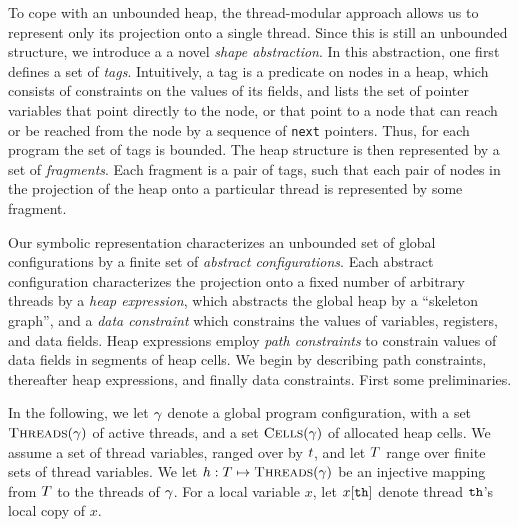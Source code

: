 To cope with an unbounded heap, the thread-modular approach allows us to
represent only its projection onto a single thread.
Since this is still an unbounded structure, we introduce a 
a novel {\em shape abstraction}. In this abstraction, one first defines a
set of {\em tags}. Intuitively, a tag is a predicate on nodes in a heap,
which consists of constraints on the values of its fields, and lists
the set of pointer variables that point directly to the node, or that point
to a node that can reach or be reached from the node by a sequence of
{\tt next} pointers. Thus, for each program the set of tags is bounded.
The heap structure is then represented by a set of {\em fragments}. Each
fragment is a pair of tags, such that each pair of nodes in the
projection of the heap onto a particular thread is represented by some
fragment.


Our symbolic representation characterizes an unbounded set of
global configurations by a finite set of {\em abstract configurations}. Each
abstract configuration characterizes the projection onto a fixed number of
arbitrary threads by a {\em heap expression}, which 
abstracts  the global heap by a ``skeleton graph'', and a {\em data constraint}
which constrains the values of variables, registers, and data fields.
Heap expressions employ {\em path constraints}
to constrain values of data fields in
segments of heap cells.
We begin by describing path constraints, thereafter heap expressions, and
finally data constraints. First some preliminaries.

In the following, we let $\gamma$ denote a global program configuration,
with a set $\mbox{\sc Threads}(\gamma)$ of active threads, and a set
$\mbox{\sc Cells}(\gamma)$ of allocated heap cells.
We assume a set of thread variables, ranged over by $t$, and
let $T$ range over finite sets of thread variables.
We let $h:T \mapsto \mbox{\sc Threads}(\gamma)$ be an injective mapping
from $T$ to the threads of $\gamma$.
For a local variable $x$, let $x[{\tt th}]$ denote thread
${\tt th}$'s local copy of $x$.

